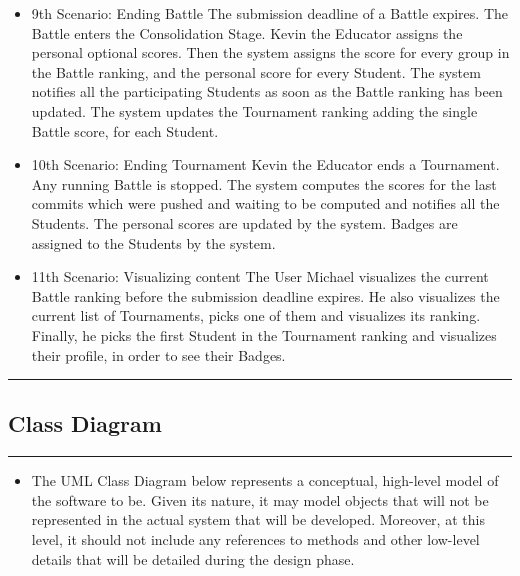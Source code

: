 \documentclass{Configuration_Files/Template}
\begin{document}
\begin{itemize}
\item \textcolor{bluepoli}{9th Scenario: Ending Battle} The submission deadline of a Battle expires. The Battle enters the Consolidation Stage. Kevin the Educator assigns the personal optional scores. Then the system assigns the score for every group in the Battle ranking, and the personal score for every Student. The system notifies all the participating Students as soon as the Battle ranking has been updated. The system updates the Tournament ranking adding the single Battle score, for each Student.
\item \textcolor{bluepoli}{10th Scenario: Ending Tournament} Kevin the Educator ends a Tournament. Any running Battle is stopped. The system computes the scores for the last commits which were pushed and waiting to be computed and notifies all the Students. The personal scores are updated by the system. Badges are assigned to the Students by the system.
\item \textcolor{bluepoli}{11th Scenario: Visualizing content} The User Michael visualizes the current Battle ranking before the submission deadline expires. He also visualizes the current list of Tournaments, picks one of them and visualizes its ranking. Finally, he picks the first Student in the Tournament ranking and visualizes their profile, in order to see their Badges.
\end{itemize}

{\color{bluepoli}\rule{\linewidth}{0.1pt}}

\subsection{Class Diagram}

{\color{bluepoli}\rule{\linewidth}{0.1pt}}

\begin{itemize}
\item The UML Class Diagram below represents a conceptual, high-level model of the software to be. Given its nature, it may model objects that will not be represented in the actual system that will be developed. Moreover, at this level, it should not include any references to methods and other low-level details that will be detailed during the design phase.\\
\end{itemize}
\end{document}
